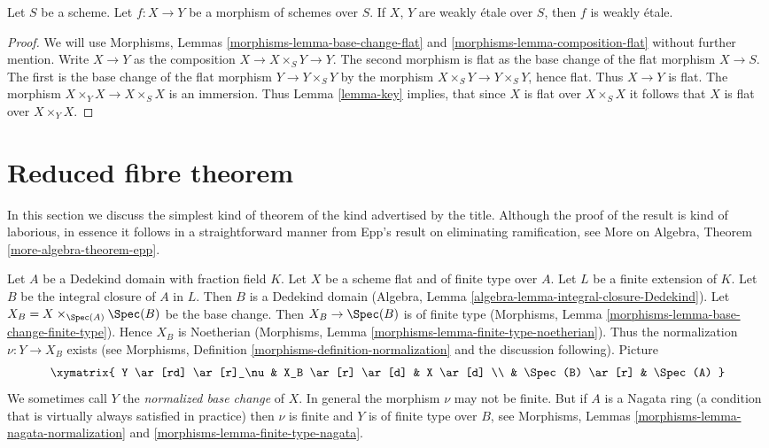 \begin{lemma}
\label{lemma-weakly-etale-permanence}
Let $S$ be a scheme. Let $f : X \to Y$ be a morphism of schemes over $S$.
If $X$, $Y$ are weakly \'etale over $S$, then $f$ is weakly \'etale.
\end{lemma}

\begin{proof}
We will use Morphisms, Lemmas \ref{morphisms-lemma-base-change-flat} and
\ref{morphisms-lemma-composition-flat} without further mention.
Write $X \to Y$ as the composition $X \to X \times_S Y \to Y$.
The second morphism is flat as the base change of the flat morphism
$X \to S$. The first is the base change of the flat morphism
$Y \to Y \times_S Y$ by the morphism $X \times_S Y \to Y \times_S Y$,
hence flat. Thus $X \to Y$ is flat. The morphism
$X \times_Y X \to X \times_S X$ is an immersion.
Thus Lemma \ref{lemma-key} implies, that since
$X$ is flat over $X \times_S X$ it follows that $X$ is
flat over $X \times_Y X$.
\end{proof}





\section{Reduced fibre theorem}
\label{section-reduced-fibre-theorem}

\noindent
In this section we discuss the simplest kind of theorem of the kind
advertised by the title. Although the proof of the result is kind of
laborious, in essence it follows in a straightforward manner from
Epp's result on eliminating ramification, see
More on Algebra, Theorem \ref{more-algebra-theorem-epp}.

\medskip\noindent
Let $A$ be a Dedekind domain with fraction field $K$.
Let $X$ be a scheme flat and of finite type over $A$.
Let $L$ be a finite extension of $K$. Let $B$ be the integral
closure of $A$ in $L$. Then $B$ is a Dedekind domain
(Algebra, Lemma \ref{algebra-lemma-integral-closure-Dedekind}).
Let $X_B = X \times_{\Spec(A)} \Spec(B)$ be the base change.
Then $X_B \to \Spec(B)$ is of finite type
(Morphisms, Lemma \ref{morphisms-lemma-base-change-finite-type}).
Hence $X_B$ is Noetherian
(Morphisms, Lemma \ref{morphisms-lemma-finite-type-noetherian}).
Thus the normalization $\nu : Y \to X_B$ exists (see
Morphisms, Definition \ref{morphisms-definition-normalization}
and the discussion following). Picture
\begin{equation}
\label{equation-normalized-base-change}
\xymatrix{
Y \ar[rd] \ar[r]_\nu & X_B \ar[r] \ar[d] & X \ar[d] \\
 & \Spec(B) \ar[r] & \Spec(A)
}
\end{equation}
We sometimes call $Y$ the {\it normalized base change} of $X$.
In general the morphism $\nu$ may not be finite. But if $A$ is
a Nagata ring (a condition that is virtually always satisfied in
practice) then $\nu$ is finite and $Y$ is of finite type over $B$, see
Morphisms, Lemmas \ref{morphisms-lemma-nagata-normalization} and
\ref{morphisms-lemma-finite-type-nagata}.

